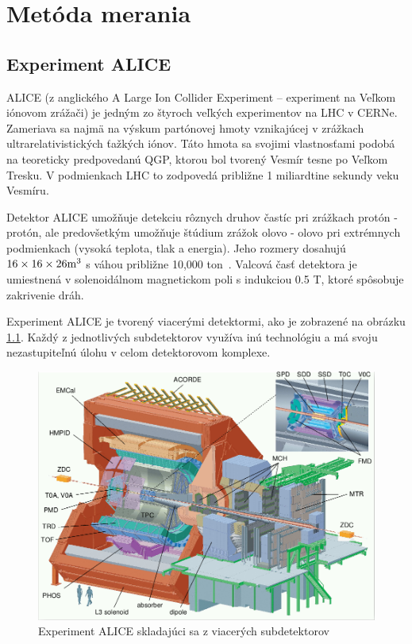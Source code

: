 \documentclass[thesismargins, thesislinespacing]{rnthesis}
\begin{document}
\chapter{Metóda merania}

\section{Experiment ALICE}

ALICE (z anglického A Large Ion Collider Experiment – experiment na Veľkom iónovom zrážači) je jedným zo štyroch veľkých experimentov na LHC v CERNe. Zameriava sa najmä na výskum partónovej hmoty vznikajúcej v zrážkach ultrarelativistických ťažkých iónov. Táto hmota sa svojimi vlastnosťami podobá na teoreticky predpovedanú QGP, ktorou bol tvorený Vesmír tesne po Veľkom Tresku. V podmienkach LHC to zodpovedá približne 1 miliardtine sekundy veku Vesmíru.

Detektor  ALICE umožňuje detekciu rôznych druhov častíc pri zrážkach protón - protón, ale predovšetkým umožňuje štúdium zrážok olovo - olovo pri extrémnych podmienkach (vysoká teplota, tlak a energia). Jeho rozmery dosahujú $16\times 16\times26 \rm{m^3}$ s váhou približne 10,000 ton~\cite{alice}. Valcová časť detektora je umiestnená v solenoidálnom magnetickom poli s indukciou 0.5 T, ktoré spôsobuje zakrivenie dráh.

Experiment ALICE je tvorený viacerými detektormi, ako je zobrazené na obrázku \ref{ALICE}. Každý z jednotlivých subdetektorov využíva inú technológiu a má svoju nezastupiteľnú úlohu v celom detektorovom komplexe.

\begin{figure}[hbtp!]
	\begin{center}
		\includegraphics[width=\textwidth]{./Obrazky_praca/ALICE.png}
		\caption{Experiment ALICE skladajúci sa z viacerých subdetektorov~\cite{aliceDetektor}}
		\label{ALICE}
	\end{center}
\end{figure}
\end{document}
